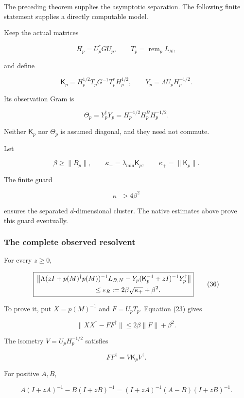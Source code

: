 \documentclass[11pt]{article}
\begin{document}
The preceding theorem supplies the asymptotic separation. The following finite statement supplies a directly computable model.

Keep the actual matrices

\[
H_p=U_p^*GU_p,\qquad
T_p=\operatorname{rem}_pL_N,
\]

and define

\[
\boxed{
\mathsf K_p
=
H_p^{1/2}T_pG^{-1}T_p^*H_p^{1/2},
\qquad
Y_p=\Lambda U_pH_p^{-1/2}.
}
\tag{33}
\]

Its observation Gram is

\[
\boxed{
\Theta_p=Y_p^\dagger Y_p
=
H_p^{-1/2}H_p^BH_p^{-1/2}.
}
\tag{34}
\]

Neither \(\mathsf K_p\) nor \(\Theta_p\) is assumed diagonal, and they need not commute.

Let

\[
\beta\ge\|B_p\|,\qquad
\kappa_-=\lambda_{\min}\mathsf K_p,\qquad
\kappa_+=\|\mathsf K_p\|.
\]

The finite guard

\[
\kappa_->4\beta^2
\tag{35}
\]

ensures the separated \(d\)-dimensional cluster. The native estimates above prove this guard eventually.

\subsubsection{The complete observed resolvent}\label{the-complete-observed-resolvent}

For every \(z\ge0\),

\[
\boxed{
\begin{aligned}
&\left\|
\Lambda(zI+p(M)^\dagger p(M))^{-1}L_{B,N}
-
Y_p(\mathsf K_p^{-1}+zI)^{-1}Y_p^\dagger
\right\|\\
&\hspace{30mm}\le
\varepsilon_R:=2\beta\sqrt{\kappa_+}+\beta^2.
\end{aligned}
}
\tag{36}
\]

To prove it, put \(X=p(M)^{-1}\) and \(F=U_pT_p\). Equation (23) gives

\[
\|XX^\dagger-FF^\dagger\|
\le2\beta\|F\|+\beta^2.
\]

The isometry \(V=U_pH_p^{-1/2}\) satisfies

\[
FF^\dagger=V\mathsf K_pV^\dagger.
\]

For positive \(A,B\),

\[
A(I+zA)^{-1}-B(I+zB)^{-1}
=
(I+zA)^{-1}(A-B)(I+zB)^{-1}.
\]
\end{document}
